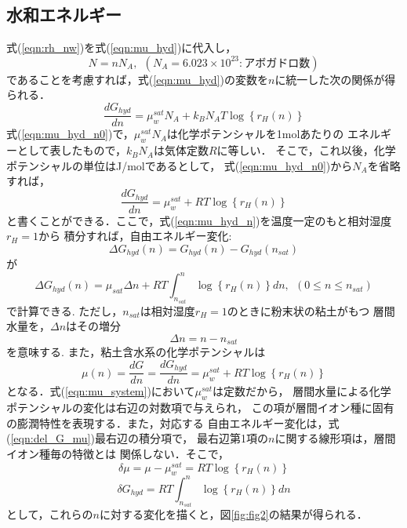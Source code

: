 \subsection{水和エネルギー}
式(\ref{eqn:rh_nw})を式(\ref{eqn:mu_hyd})に代入し，
\begin{equation}
	N=nN_A, \ \ (N_A=6.023\times 10^{23}:アボガドロ数)
	\label{eqn:}
\end{equation}
であることを考慮すれば，式(\ref{eqn:mu_hyd})の変数を\(n\)に統一した次の関係が得られる．
\begin{equation}
	\frac{d G_{hyd}}{d n}
	=
	\mu_w^{sat}N_A +k_BN_AT \log \left\{ r_H(n) \right\}
	\label{eqn:mu_hyd_n0}
\end{equation}
式(\ref{eqn:mu_hyd_n0})で，\(\mu_w^{sat}N_A\)は化学ポテンシャルを1molあたりの
エネルギーとして表したもので，\(k_B N_A\)は気体定数\(R\)に等しい．
そこで，これ以後，化学ポテンシャルの単位はJ/molであるとして，
式(\ref{eqn:mu_hyd_n0})から\(N_A\)を省略すれば，
\begin{equation}
	\frac{d G_{hyd}}{d n}
	=
	\mu_w^{sat} +RT \log \left\{ r_H(n) \right\}
	\label{eqn:mu_hyd_n}
\end{equation}
と書くことができる．ここで，式(\ref{eqn:mu_hyd_n})を温度一定のもと相対湿度$r_H=1$から
積分すれば，自由エネルギー変化:
\begin{equation}
	\Delta G_{hyd}(n) = G_{hyd}(n)-G_{hyd}(n_{sat})
	\label{eqn:del_G}
\end{equation}
が
\begin{equation}
	\Delta G_{hyd}(n)
	=
	\mu_{sat}\Delta n
	+
	RT
	\int_{n_{sat}}^{n} \log \left\{ r_H(n)\right\} dn, \ \ (0 \leq n \leq n_{sat})
	\label{eqn:del_G_mu}
\end{equation}
で計算できる. ただし，\(n_{sat}\)は相対湿度\(r_H=1\)のときに粉末状の粘土がもつ
層間水量を，\(\Delta n\)はその増分
\begin{equation}
	\Delta n = n-n_{sat}
\end{equation}
を意味する. また，粘土含水系の化学ポテンシャルは
\begin{equation}
	\mu(n)
	=
	\frac{d G}{d n}
	=
	\frac{d G_{hyd}}{d n}
	=
	\mu_w^{sat} +RT \log \left\{ r_H(n) \right\}
	\label{eqn:mu_system}
\end{equation}
となる．式(\ref{eqn:mu_system})において$\mu_w^{sat}$は定数だから，
層間水量による化学ポテンシャルの変化は右辺の対数項で与えられ，
この項が層間イオン種に固有の膨潤特性を表現する．また，対応する
自由エネルギー変化は，式(\ref{eqn:del_G_mu})最右辺の積分項で，
最右辺第1項の\(n\)に関する線形項は，層間イオン種毎の特徴とは
関係しない．そこで，
\begin{equation}
	\delta \mu = \mu-\mu_{w}^{sat}
	=
	RT \log \left\{ r_H(n)\right\}
\end{equation}
\begin{equation}
	\delta G_{hyd} =
	RT
	\int_{n_{sat}}^{n} \log \left\{ r_H(n)\right\} dn
\end{equation}
として，これらの\(n\)に対する変化を描くと，図\ref{fig:fig2}の結果が得られる．

